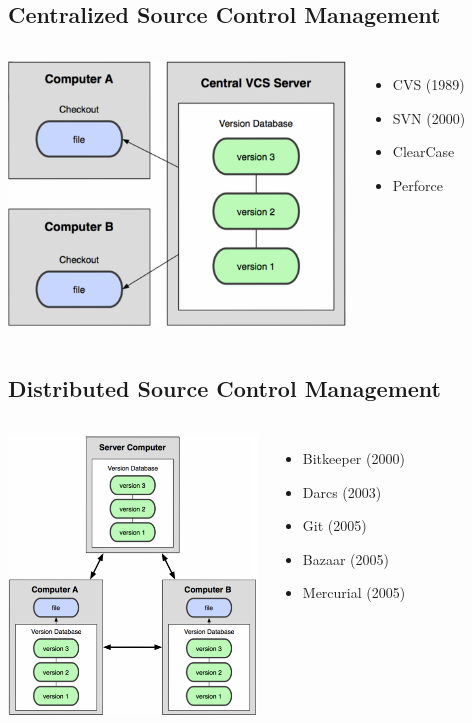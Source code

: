 \subsection{Centralized Source Control Management}
\begin{frame}
\begin{columns}[c]
\column{2in}
\includegraphics[scale=.5]{../figures/git/centralized_scm.png}
\column{1in}
\begin{itemize}
\item{CVS (1989)}
\item{SVN (2000)}
\item{ClearCase}
\item{Perforce}
\end{itemize}
\end{columns}
\end{frame}

\subsection{Distributed Source Control Management}
\begin{frame}
\begin{columns}
\column{2in}
\includegraphics[scale=.5]{../figures/git/distributed_scm.png}
\column{1in}
\begin{itemize}
\item{Bitkeeper (2000)}
\item{Darcs (2003)}
\item{Git (2005)}
\item{Bazaar (2005)}
\item{Mercurial (2005)}
\end{itemize}
\end{columns}
\end{frame}

